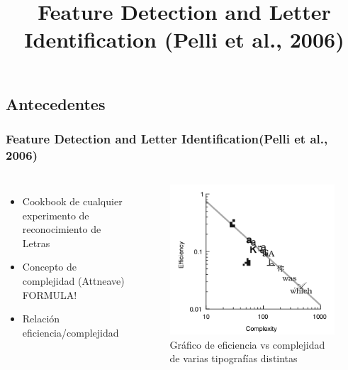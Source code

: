 \documentclass{beamer}
\begin{document}
  \subsection{Antecedentes}
	\begin{frame}
	\frametitle{Feature Detection and Letter Identification(Pelli et al., 2006)}
	\begin{columns}[t]
	\title{Feature Detection and Letter Identification (Pelli et al., 2006)}
	\begin{itemize}
		\item Cookbook de cualquier experimento de reconocimiento de Letras
		\item Concepto de complejidad (Attneave) FORMULA!
		\item Relación eficiencia/complejidad
	\end{itemize}


	\begin{figure}
	\includegraphics[width=\textwidth]{graficos/pelli4.png}
	\caption{Gráfico de eficiencia vs complejidad de varias tipografías distintas}
	\end{figure}

	\end{columns}
	\end{frame}
\end{document}
